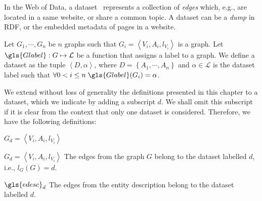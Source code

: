 In the Web of Data, a dataset~\cite{alexander:2009:dld} represents a collection of \emph{edges} which, e.g., are located in a same website, or share a common topic. A dataset can be a \emph{dump} in RDF, or the embedded metadata of pages in a website.

\begin{definition}[Dataset]
Let $G_1, \cdots, G_n$ be $n$ graphs such that $G_i = \left\langle V_i, A_i, l_{V_i} \right\rangle$ is a graph.
Let $\gls{Glabel} : G \mapsto \mathcal{L}$ be a function that assigns a label to a graph.
We define a dataset as the tuple $\left\langle D, \alpha \right\rangle$, where $D = \left\lbrace A_1, \cdots, A_n \right\rbrace$ and $\alpha \in \mathcal{L}$ is the dataset label such that $\forall 0 < i \le n\; \gls{Glabel}(G_i) = \alpha$.
\end{definition}

We extend without loss of generality the definitions presented in this chapter to a dataset, which we indicate by adding a subscript $d$. We shall omit this subscript if it is clear from the context that only one dataset is considered. Therefore, we have the following definitions:

\begin{labeling}{$G_d = \left\langle V_i, A_i, l_{V_i} \right\rangle$}
\item[$G_d = \left\langle V_i, A_i, l_{V_i} \right\rangle$] The edges from the graph $G$ belong to the dataset labelled $d$, i.e., $l_G(G) = d$.
\item[$\gls{edesc}_d$] The edges from the entity description belong to the dataset labelled $d$.
\end{labeling}
